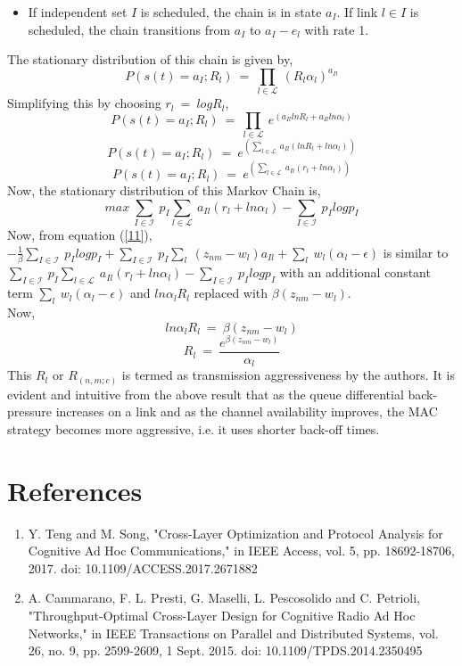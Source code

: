 \documentclass[12pt, draftcls, onecolumn]{IEEEtran}
\begin{document}
\begin{itemize}
\begin{itemize}
        \item If independent set $I$ is scheduled, the chain is in state $a_I$. If link $l \in I$ is scheduled, the chain transitions from $a_I$ to $a_I - e_l$ with rate 1.
    \end{itemize}
    The stationary distribution of this chain is given by,
    \[P(s(t)=a_I;R_l)\ =\ \prod_{l \in \mathcal{L}}\ (R_l \alpha_l)^{a_{Il}}\]
    Simplifying this by choosing $r_l\ =\ log R_l$,
    \[P(s(t)=a_I;R_l)\ =\ \prod_{l \in \mathcal{L}}\ e^{(a_{Il}ln R_l + a_{Il}ln \alpha_l)}\]
    \[P(s(t)=a_I;R_l)\ =\ e^{(\sum_{l \in \mathcal{L}}\ a_{Il}(ln R_l + ln \alpha_l))}\]
    \[P(s(t)=a_I;R_l)\ =\ e^{(\sum_{l \in \mathcal{L}}\ a_{Il}(r_l + ln \alpha_l))}\]
    Now, the stationary distribution of this Markov Chain is,
    \[max\ \sum_{I \in \mathcal{I}}\ p_I \sum_{l \in \mathcal{L}}\ a_{Il}(r_l + ln \alpha_l) - \sum_{I \in \mathcal{I}}\ p_I log p_I\]
    Now, from equation (\ref{11}), $- \frac{1}{\beta}\sum_{I \in \mathcal{I}}\ p_I log p_I + \sum_{I \in \mathcal{I}}\ p_I\sum_{l}\ (z_{nm} - w_l)a_{Il} + \sum_{l}\ w_l(\alpha_l - \epsilon)$ is similar to $\sum_{I \in \mathcal{I}}\ p_I \sum_{l \in \mathcal{L}}\ a_{Il}(r_l + ln \alpha_l) - \sum_{I \in \mathcal{I}}\ p_I log p_I$ with an additional constant term $\sum_{l}\ w_l(\alpha_l - \epsilon)$ and $ln \alpha_l R_l$ replaced with $\beta(z_{nm} - w_l)$.
    \\Now,
    \[ln \alpha_l R_l\ =\ \beta(z_{nm} - w_l)\]
    \[R_l\ =\ \frac{e^{\beta(z_{nm} - w_l)}}{\alpha_l}\]
    This $R_l$ or $R_{(n,m;c)}$ is termed as transmission aggressiveness by the authors. It is evident and intuitive from the above result that as the queue differential back-pressure increases on a link and as the channel availability improves, the MAC strategy becomes more aggressive, i.e. it uses shorter back-off times.
\end{itemize}
\section{References}


\begin{enumerate}
    \item Y. Teng and M. Song, "Cross-Layer Optimization and Protocol Analysis for Cognitive Ad Hoc Communications," in IEEE Access, vol. 5, pp. 18692-18706, 2017. doi: 10.1109/ACCESS.2017.2671882\label{1}
    \item A. Cammarano, F. L. Presti, G. Maselli, L. Pescosolido and C. Petrioli, "Throughput-Optimal Cross-Layer Design for Cognitive Radio Ad Hoc Networks," in IEEE Transactions on Parallel and Distributed Systems, vol. 26, no. 9, pp. 2599-2609, 1 Sept. 2015. doi: 10.1109/TPDS.2014.2350495\label{2}
\end{enumerate}
\clearpage
\end{document}
